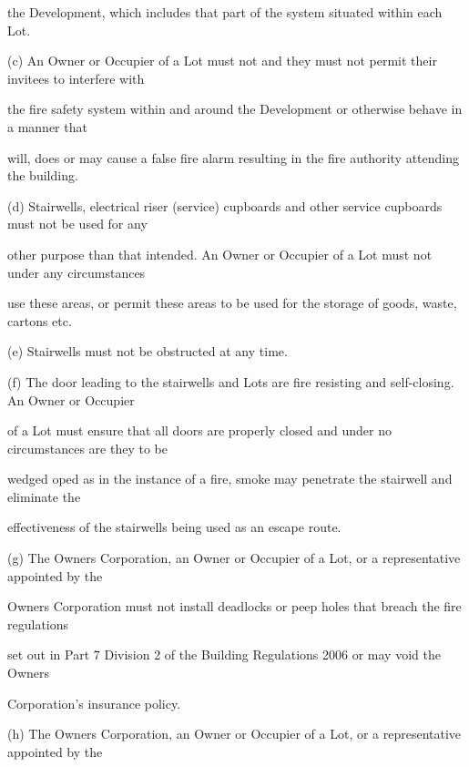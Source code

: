\documentclass{article}
\begin{document}
{\fontsize{10.02}{1}the Development, which includes that part of the system situated within each Lot. }

{\fontsize{9.962}{1}(c) An Owner or Occupier of a Lot must not and they must not permit their invitees to interfere with }

{\fontsize{10.02}{1}the fire safety system within and around the Development or otherwise behave in a manner that }

{\fontsize{10.02}{1}will, does or may cause a false fire alarm resulting in the fire authority attending the building. }

\newpage

{\fontsize{9.962}{1}(d) Stairwells, electrical riser (service) cupboards and other service cupboards must not be used for any }

{\fontsize{10.02}{1}other purpose than that intended. An Owner or Occupier of a Lot must not under any circumstances }

{\fontsize{10.02}{1}use these areas, or permit these areas to be used for the storage of goods, waste, cartons etc. }

{\fontsize{9.962}{1}(e) Stairwells must not be obstructed at any time. }

{\fontsize{9.962}{1}(f) The door leading to the stairwells and Lots are fire resisting and self-closing. An Owner or Occupier }

{\fontsize{10.02}{1}of a Lot must ensure that all doors are properly closed and under no circumstances are they to be }

{\fontsize{10.02}{1}wedged oped as in the instance of a fire, smoke may penetrate the stairwell and eliminate the }

{\fontsize{10.02}{1}effectiveness of the stairwells being used as an escape route. }

{\fontsize{9.962}{1}(g) The Owners Corporation, an Owner or Occupier of a Lot, or a representative appointed by the }

{\fontsize{10.02}{1}Owners Corporation must not install deadlocks or peep holes that breach the fire regulations }

{\fontsize{10.02}{1}set out in Part 7 Division 2 of the Building Regulations 2006 or may void the Owners }

{\fontsize{10.02}{1}Corporation’s insurance policy. }

{\fontsize{9.962}{1}(h) The Owners Corporation, an Owner or Occupier of a Lot, or a representative appointed by the }
\end{document}
